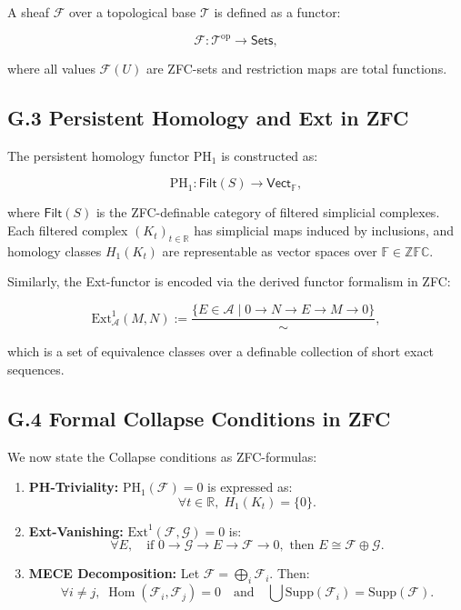 \documentclass[11pt]{article}
\DeclareMathOperator{\Hom}{Hom}
\begin{document}
A sheaf \( \mathcal{F} \) over a topological base \( \mathcal{T} \) is defined as a functor:

\[
\mathcal{F} : \mathcal{T}^{\mathrm{op}} \to \mathsf{Sets},
\]

where all values \( \mathcal{F}(U) \) are ZFC-sets and restriction maps are total functions.

\subsection*{G.3 Persistent Homology and Ext in ZFC}

The persistent homology functor \( \mathrm{PH}_1 \) is constructed as:

\[
\mathrm{PH}_1 : \mathsf{Filt}(S) \to \mathsf{Vect}_{\mathbb{F}},
\]

where \( \mathsf{Filt}(S) \) is the ZFC-definable category of filtered simplicial complexes.  
Each filtered complex \( (K_t)_{t \in \mathbb{R}} \) has simplicial maps induced by inclusions,  
and homology classes \( H_1(K_t) \) are representable as vector spaces over \( \mathbb{F} \in \mathbb{ZFC} \).

Similarly, the Ext-functor is encoded via the derived functor formalism in ZFC:

\[
\mathrm{Ext}^1_{\mathcal{A}}(M, N) := \frac{\{E \in \mathcal{A} \mid 0 \to N \to E \to M \to 0\}}{\sim},
\]

which is a set of equivalence classes over a definable collection of short exact sequences.

\subsection*{G.4 Formal Collapse Conditions in ZFC}

We now state the Collapse conditions as ZFC-formulas:

\begin{enumerate}
  \item \textbf{PH-Triviality:} \( \mathrm{PH}_1(\mathcal{F}) = 0 \) is expressed as:
  \[
  \forall t \in \mathbb{R}, \; H_1(K_t) = \{0\}.
  \]
  \item \textbf{Ext-Vanishing:} \( \mathrm{Ext}^1(\mathcal{F}, \mathcal{G}) = 0 \) is:
  \[
  \forall E, \quad \text{if } 0 \to \mathcal{G} \to E \to \mathcal{F} \to 0, \text{ then } E \cong \mathcal{F} \oplus \mathcal{G}.
  \]
  \item \textbf{MECE Decomposition:} Let \( \mathcal{F} = \bigoplus_i \mathcal{F}_i \). Then:
  \[
  \forall i \ne j, \; \Hom(\mathcal{F}_i, \mathcal{F}_j) = 0 \quad \text{and} \quad \bigcup \mathrm{Supp}(\mathcal{F}_i) = \mathrm{Supp}(\mathcal{F}).
  \]
\end{enumerate}
\end{document}
